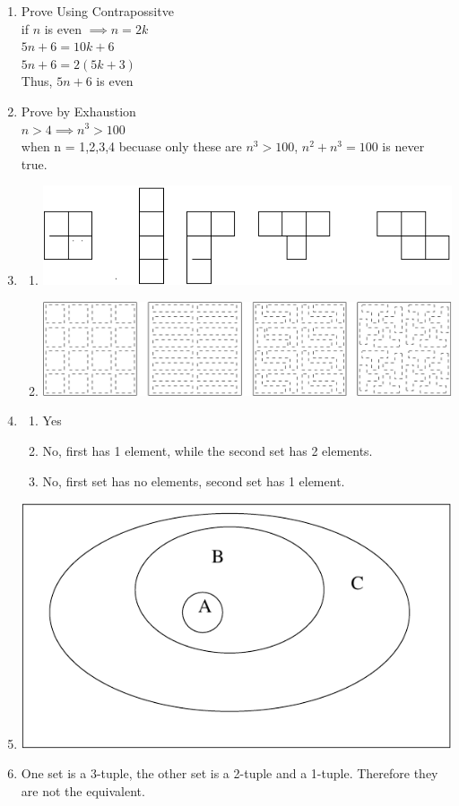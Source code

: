 \documentclass{article}
\begin{document}
\begin{enumerate}
\item Prove Using Contrapossitve \\
 if $n$ is even $\implies n = 2k$ \\
 $5n+6 = 10k+6$ \\
 $5n+6 = 2(5k+3)$ \\
 Thus, $5n+6$ is even

\item Prove by Exhaustion \\
 $n > 4 \implies n^3 >100$ \\
 when n = 1,2,3,4 becuase only these are $n^3 >100$, $n^2 + n^3 = 100$ is never true. 

\item
 \begin{enumerate}
 \item 
  \includegraphics[width = .5 \textwidth] {Q7A_drawings}
 \item
  \includegraphics[width = .5 \textwidth] {Q7B_drawings} 
 \end{enumerate}

\item
 \begin{enumerate}
 \item Yes
 \item No, first has 1 element, while the second set has 2 elements.
 \item No, first set has no elements, second set has 1 element.
 \end{enumerate} 

\item
 \includegraphics[width = .3 \textwidth] {Q9}

\item One set is a 3-tuple, the other set is a 2-tuple and a 1-tuple. Therefore they are not the equivalent.


\end{enumerate}
\end{document}
